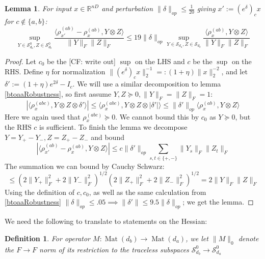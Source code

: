 \documentclass{article}
\newtheorem{lemma}[theorem]{Lemma}
\newtheorem{definition}{Definition}
\newcommand{\R}{{\mathbb{R}}}
\newcommand{\mat}{\operatorname{Mat}}
\newcommand\Sym{\mathcal{S}}
\newcommand\samp{x}
\newcommand{\CF}[1]{{\color{purple}[CF: #1]}}
\begin{document}
\begin{lemma} \label{ctoabRobustness}
For input $\samp \in \R^{nD}$ and perturbation $\|\delta\|_{op} \leq \frac{1}{20}$ giving $\samp' := (e^{\delta})_{c} \samp$ for $c \not\in \{a,b\}$:
\[ \sup_{Y \in \Sym_{d_{a}}^{0}, Z \in \Sym_{d_{b}}^{0}} \frac{\langle \rho_{\samp'}^{(ab)} - \rho_{\samp}^{(ab)}, Y \otimes Z \rangle}{\|Y\|_{F} \|Z\|_{F}} \leq 19 \|\delta\|_{op} \sup_{Y \in \Sym_{d_{a}}, Z \in \Sym_{d_{b}}} \frac{\langle \rho_{\samp}^{(ab)}, Y \otimes Z \rangle}{\|Y\|_{F} \|Z\|_{F}}        \]
\end{lemma}
\begin{proof}
Let $c_{0}$ be the \CF{write out} $\sup$ on the LHS and $c$ be the $\sup$ on the RHS. Define $\eta$ for normalization $\|(e^{\delta})_{c} \samp\|_{2}^{-1} =: (1+\eta) \|\samp\|_{2}^{-2}$, and let $\delta' := (1+\eta) e^{2 \delta} - I_{c}$. We will use a similar decomposition to lemma \ref{btoaaRobustness}, so first assume $Y,Z \succeq 0, \|Y\|_{F} = \|Z\|_{F} = 1$:
\[ |\langle \rho_{\samp}^{(abc)}, Y \otimes Z \otimes \delta' \rangle| \leq \langle \rho_{\samp}^{(abc)}, Y \otimes Z \otimes |\delta'| \rangle \leq \|\delta'\|_{op} \langle \rho_{\samp}^{(ab)}, Y \otimes Z \rangle   \]
Here we again used that $\rho_{\samp}^{(abc)} \succeq 0$. We cannot bound this by $c_{0}$ as $Y \succeq 0$, but the RHS $c$ is sufficient.  
To finish the lemma we decompose $Y = Y_{+} - Y_{-}, Z = Z_{+} - Z_{-}$ and bound
\[ |\langle \rho_{\samp'}^{(ab)} - \rho_{\samp}^{(ab)}, Y \otimes Z \rangle| \leq c \|\delta'\|_{op} \sum_{s,t \in \{+,-\}} \|Y_{s}\|_{F} \|Z_{t}\|_{F}   \]
The summation we can bound by Cauchy Schwarz:
\[ \leq (2\|Y_{+}\|_{F}^{2} + 2\|Y_{-}\|_{F}^{2})^{1/2} (2\|Z_{+}\|_{F}^{2} + 2\|Z_{-}\|_{F}^{2})^{1/2} = 2 \|Y\|_{F} \|Z\|_{F}     \]
Using the definition of $c,c_{0}$, as well as the same calculation from \ref{btoaaRobustness} $\|\delta\|_{op} \leq .05 \implies \|\delta'\| \leq 9.5 \|\delta\|_{op}$; we get the lemma. 
\end{proof}

We need the following to translate to statements on the Hessian:

\begin{definition}
For operator $M : \mat(d_{b}) \to \mat(d_{a})$, we let $\|M\|_{0}$ denote the $F \to F$ norm of its restriction to the traceless subspaces $\Sym^0_{d_b} \to \Sym^0_{d_a}$
\end{definition}
\end{document}
